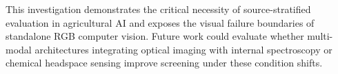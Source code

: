 \noindent This investigation demonstrates the critical necessity of source-stratified evaluation in agricultural AI and exposes the visual failure boundaries of standalone RGB computer vision. Future work could evaluate whether multi-modal architectures integrating optical imaging with internal spectroscopy or chemical headspace sensing improve screening under these condition shifts.
